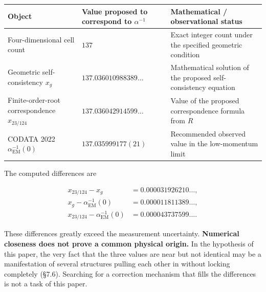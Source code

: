 \documentclass[
  a4paper,
]{article}
\newcounter{none} %
\begin{document}
{\def\LTcaptype{none} %
\begin{longtable}[]{@{}
  >{\raggedright\arraybackslash}p{}
  >{\raggedleft\arraybackslash}p{}
  >{\raggedright\arraybackslash}p{}@{}}
\toprule\noalign{}
\begin{minipage}[b]{\linewidth}\raggedright
Object
\end{minipage} & \begin{minipage}[b]{\linewidth}\raggedleft
Value proposed to correspond to \(\alpha^{-1}\)
\end{minipage} & \begin{minipage}[b]{\linewidth}\raggedright
Mathematical / observational status
\end{minipage} \\
\midrule\noalign{}
\endhead
\bottomrule\noalign{}
\endlastfoot
Four-dimensional cell count & \(137\) & Exact integer count under the
specified geometric condition \\
Geometric self-consistency \(x_g\) & \(137.036010988389\ldots\) &
Mathematical solution of the proposed self-consistency equation \\
Finite-order-root correspondence \(x_{23/124}\) &
\(137.036042914599\ldots\) & Value of the proposed correspondence
formula from \(R\) \\
CODATA 2022 \(\alpha_{\mathrm{EM}}^{-1}(0)\) & \(137.035999177(21)\) &
Recommended observed value in the low-momentum limit \\
\end{longtable}
}

The computed differences are

\[
\begin{aligned}
x_{23/124}-x_g&=0.000031926210\ldots,\\
x_g-\alpha_{\mathrm{EM}}^{-1}(0)&=0.000011811389\ldots,\\
x_{23/124}-\alpha_{\mathrm{EM}}^{-1}(0)&=0.000043737599\ldots.
\end{aligned}
\tag{12}
\]

These differences greatly exceed the measurement uncertainty.
\textbf{Numerical closeness does not prove a common physical origin.} In
the hypothesis of this paper, the very fact that the three values are
near but not identical may be a manifestation of several structures
pulling each other in without locking completely (§7.6). Searching for a
correction mechanism that fills the differences is not a task of this
paper.
\end{document}
